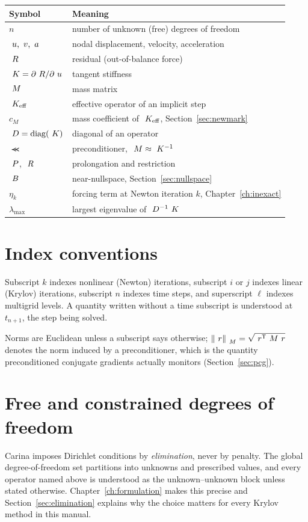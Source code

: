 \begin{tabular}{@{}ll@{}}
\toprule
Symbol & Meaning \\
\midrule
$n$                     & number of unknown (free) degrees of freedom \\
$~u, ~v, ~a$   & nodal displacement, velocity, acceleration \\
$~R$                 & residual (out-of-balance force) \\
$~K = \partial~R/\partial~u$ & tangent stiffness \\
$~M$                 & mass matrix \\
$~K_{\mathrm{eff}}$                 & effective operator of an implicit step \\
$c_M$                   & mass coefficient of $~K_{\mathrm{eff}}$, Section~\ref{sec:newmark} \\
$~D = \operatorname{diag}(~K)$  & diagonal of an operator \\
$\Prec$                 & preconditioner, $~M \approx ~K^{-1}$ \\
$~P$, $~R$       & prolongation and restriction \\
$~B$                & near-nullspace, Section~\ref{sec:nullspace} \\
$\eta_k$                & forcing term at Newton iteration $k$, Chapter~\ref{ch:inexact} \\
$\lambda_{\max}$        & largest eigenvalue of $~D^{-1}~K$ \\
\bottomrule
\end{tabular}

\section*{Index conventions}

Subscript $k$ indexes nonlinear (Newton) iterations, subscript $i$ or $j$
indexes linear (Krylov) iterations, subscript $n$ indexes time steps, and
superscript $\ell$ indexes multigrid levels.  A quantity written without a time
subscript is understood at $t_{n+1}$, the step being solved.

Norms are Euclidean unless a subscript says otherwise; $\left\lVert ~r \right\rVert_{~M}
= \sqrt{~r^{\mathsf{T}}~M~r}$ denotes the norm induced by a
preconditioner, which is the quantity preconditioned conjugate gradients
actually monitors (Section~\ref{sec:pcg}).

\section*{Free and constrained degrees of freedom}

Carina imposes Dirichlet conditions by \emph{elimination}, never by penalty.
The global degree-of-freedom set partitions into unknowns and prescribed
values, and every operator named above is understood as the unknown--unknown
block unless stated otherwise.  Chapter~\ref{ch:formulation} makes this precise
and Section~\ref{sec:elimination} explains why the choice matters for every
Krylov method in this manual.
